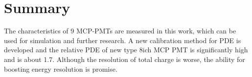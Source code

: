 \section{Summary}
\label{Summary}
The characteristics of 9 MCP-PMTs are measured in this work, which can be used for simulation and further research. A new calibration method for PDE is developed and the relative PDE of new type 8ich MCP PMT is significantly high and is about 1.7. Although the resolution of total charge is worse, the ability for boosting energy resolution is promise.